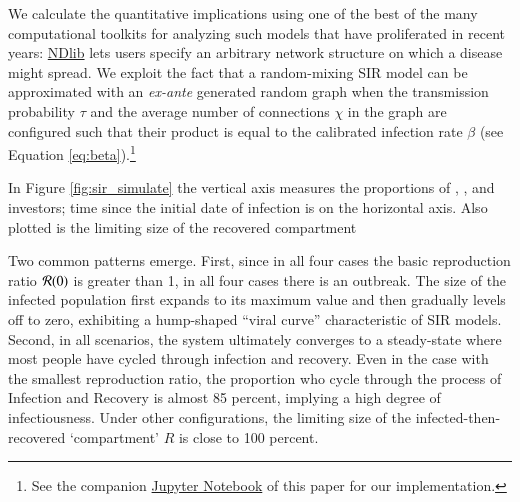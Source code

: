 We calculate the quantitative implications using one of the best of the many computational toolkits for analyzing such models that have proliferated in recent years:  %
\href{https://ndlib.readthedocs.io/en/latest/}{NDlib} lets users specify an arbitrary network structure on which a disease might spread. We exploit the fact that a random-mixing SIR model can be approximated with an \textit{ex-ante} generated random graph when the transmission probability $\tau$ and the average number of connections $\chi$ in the graph are configured such that their product is equal to the calibrated infection rate $\beta$ (see Equation \ref{eq:beta}).\footnote{See the companion \href{https://github.com/llorracc/EpiExp/blob/master/SIR_Ndlib.ipynb}{Jupyter Notebook} of this paper for our  implementation.}

In Figure \ref{fig:sir_simulate} the vertical axis measures the proportions of {\Susceptible}, {\Infected}, and {\Recovered} investors; time since the initial date of infection is on the horizontal axis.  Also plotted is the limiting size of the recovered compartment %

Two common patterns emerge.  First, since in all four cases the basic reproduction ratio $\Rzero$ is greater than 1, in all four cases there is an outbreak. The size of the infected population first expands to its maximum value and then gradually levels off to zero, exhibiting a hump-shaped ``viral curve'' characteristic of SIR models.  Second, in all scenarios, the system ultimately converges to a steady-state where most people have cycled through infection and recovery. Even in the case with the smallest reproduction ratio, the proportion who cycle through the process of Infection and Recovery is almost 85 percent, implying a high degree of infectiousness. Under other configurations, the limiting size of the infected-then-recovered `compartment' $R$ is close to 100 percent.


